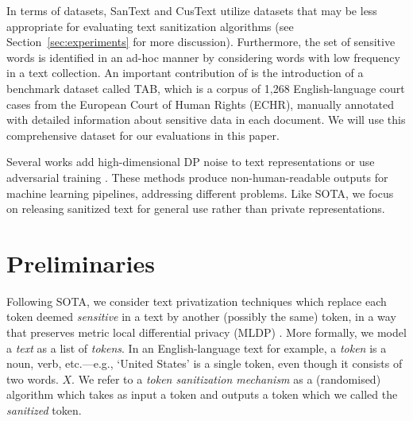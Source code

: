 \documentclass[11pt]{article}
\begin{document}
In terms of datasets, SanText and CusText utilize datasets that may be less appropriate for evaluating text sanitization algorithms (see Section~\ref{sec:experiments} for more discussion). 
Furthermore, the set of sensitive words is identified in an ad-hoc manner by considering words with low frequency in a text collection.
An important contribution of \cite{pilan2022text} is the introduction of a benchmark dataset called TAB, which is a corpus of 1,268 English-language court cases from the European Court of Human Rights (ECHR), manually annotated with detailed information about sensitive data in each document.
We will use this comprehensive dataset for our evaluations in this paper. 



Several works add high-dimensional DP noise to text representations \cite{feyisetan2019leveraging, feyisetan2020privacy, lyu2020differentially, lyu2020towards} or use adversarial training \cite{xie2017controllable, coavoux2018privacy, elazar2018adversarial, li2018towards}. 
These methods produce non-human-readable outputs for machine learning pipelines, addressing different problems. Like SOTA, we focus on releasing sanitized text for general use rather than private representations.


\section{Preliminaries}
\label{sec:prelim}

Following SOTA, we consider text privatization techniques which replace each token deemed {\em sensitive} in a text by another (possibly the same) token, in a way that preserves metric local differential privacy (MLDP) \cite{alvim2018local}. 
More formally, we model a {\em text} as a list of {\em tokens}.  
In an English-language text for example, a {\em token} is a noun, verb, etc.---e.g., `United States' is a single token, even though it consists of two words. 
$X$. %
We refer to a {\em token sanitization mechanism} as a (randomised) algorithm which takes as input a token and outputs a token which we called the {\em sanitized} token.
\end{document}
